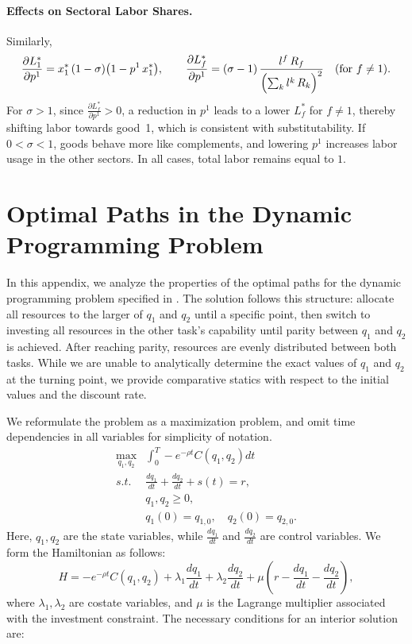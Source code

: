 \documentclass{article}
\theoremstyle{plain}
\theoremstyle{plain}
\begin{document}
\paragraph{Effects on Sectoral Labor Shares.}
Similarly, 
\[
\frac{\partial L_{1}^*}{\partial p^1}
=
x_{1}^*\,(1-\sigma)\bigl(1 - p^1\,x_{1}^*\bigr),
\qquad
\frac{\partial L_{f}^*}{\partial p^1}
=
(\sigma-1)\,
\frac{\,l_{}^f\, R_{f}\,}{\Bigl(\sum_{k} l_{}^k\, R_{k}\Bigr)^{2}}
\quad (\text{for } f\neq 1).
\]
For $\sigma>1$, since $\frac{\partial L_{f}^*}{\partial p^1}>0$, a reduction in $p^1$ leads to a lower $L_f^*$ for $f\neq 1$, thereby shifting labor towards good~1, which is consistent with substitutability.  
If $0<\sigma<1$, goods behave more like complements, and lowering $p^1$ increases labor usage in the other sectors.  
In all cases, total labor remains equal to $1$.


\section{Optimal Paths in the Dynamic Programming Problem}
\label{app:dp_proof}

In this appendix, we analyze the properties of the optimal paths for the dynamic programming problem specified in \pageref{eq:dp_problem}.  
The solution follows this structure: allocate all resources to the larger of $q_{1}$ and $q_{2}$ until a specific point, then switch to investing all resources in the other task’s capability until parity between $q_{1}$ and $q_{2}$ is achieved.  
After reaching parity, resources are evenly distributed between both tasks.  
While we are unable to analytically determine the exact values of $q_{1}$ and $q_{2}$ at the turning point, we provide comparative statics with respect to the initial values and the discount rate.

We reformulate the problem as a maximization problem, and omit time dependencies in all variables for simplicity of notation.
\begin{align*}
\max_{q_{1},q_{2}} & \int_{0}^{T}-e^{-\rho t}C(q_{1},q_{2})dt\\
s.t. & \frac{dq_{1}}{dt}+\frac{dq_{2}}{dt}+s(t)=r,\\
 & q_{1},q_{2}\geq0,\\
 & q_{1}(0)=q_{1,0},\quad q_{2}(0)=q_{2,0}.
\end{align*}
Here, $q_{1},q_{2}$ are the state variables, while $\frac{dq_{1}}{dt}$ and $\frac{dq_{2}}{dt}$ are control variables.  
We form the Hamiltonian as follows: 
\[
H=-e^{-\rho t}C(q_{1},q_{2})+\lambda_{1}\frac{dq_{1}}{dt}+\lambda_{2}\frac{dq_{2}}{dt}+\mu\left(r-\frac{dq_{1}}{dt}-\frac{dq_{2}}{dt}\right),
\]
where $\lambda_{1},\lambda_{2}$ are costate variables, and $\mu$ is the Lagrange multiplier associated with the investment constraint.  
The necessary conditions for an interior solution are: %
\end{document}
